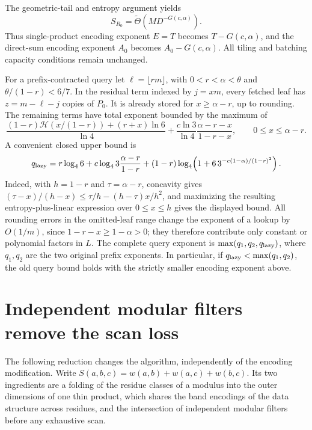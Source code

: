 \documentclass[11pt]{article}
\newcommand{\HH}{\mathcal H}
\begin{document}
The geometric-tail and entropy argument yields
\[
S_{R_0}=\widetilde\Theta(MD^{-G(c,\alpha)}).
\]
Thus single-product encoding exponent $E=T$ becomes $T-G(c,\alpha)$,
and the direct-sum encoding exponent $A_0$ becomes $A_0-G(c,\alpha)$.
All tiling and batching capacity conditions remain unchanged.

For a prefix-contracted query let $\ell=\lfloor rm\rfloor$, with
$0<r<\alpha<\theta$ and $\theta/(1-r)<6/7$. In the residual term indexed
by $j=xm$, every fetched leaf has $z=m-\ell-j$ copies of $P_0$. It is
already stored for $x\ge\alpha-r$, up to rounding. The remaining terms
have total exponent bounded by the maximum of
\[
\frac{(1-r)\HH(x/(1-r))+(r+x)\ln6}{\ln4}
+\frac{c\ln3}{\ln4}\frac{\alpha-r-x}{1-r-x},
\qquad 0\le x\le\alpha-r.
\]
A convenient closed upper bound is
\[
q_{\rm lazy}=r\log_4 6
 +c\log_4 3\frac{\alpha-r}{1-r}
 +(1-r)\log_4\!\left(1+6\,3^{-c(1-\alpha)/(1-r)^2}\right).
\]
Indeed, with $h=1-r$ and $\tau=\alpha-r$, concavity gives
$(\tau-x)/(h-x)\le\tau/h-(h-\tau)x/h^2$, and maximizing the resulting
entropy-plus-linear expression over $0\le x\le h$ gives the displayed
bound. All rounding errors in the omitted-leaf range change the exponent of a
lookup by $O(1/m)$, since $1-r-x\ge1-\alpha>0$; they therefore contribute
only constant or polynomial factors in $L$. The complete query exponent is
$\max(q_1,q_2,q_{\rm lazy})$, where $q_1,q_2$ are the two original prefix
exponents. In particular, if $q_{\rm lazy}<\max(q_1,q_2)$, the old query
bound holds with the strictly smaller encoding exponent above.

\section{Independent modular filters remove the scan loss}
The following reduction changes the algorithm, independently of the
encoding modification. Write $S(a,b,c)=w(a,b)+w(a,c)+w(b,c)$.
Its two ingredients are a folding of the residue classes of a modulus into
the outer dimensions of one thin product, which shares the band encodings
of the data structure across residues, and the intersection of independent
modular filters before any exhaustive scan.
\end{document}
